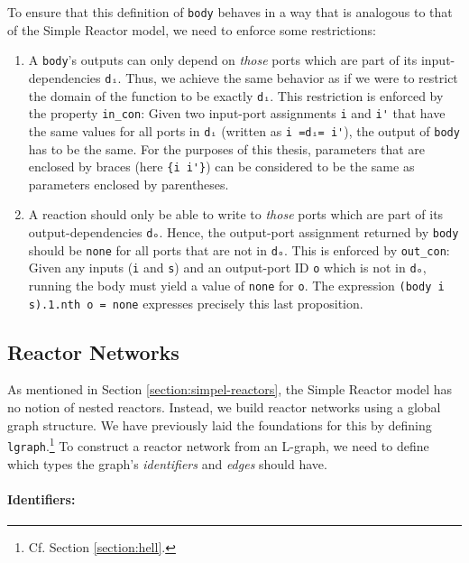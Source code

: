 To ensure that this definition of \lstinline{body} behaves in a way that is analogous to that of the Simple Reactor model, we need to enforce some restrictions:

\begin{enumerate}
    \item A \lstinline{body}'s outputs can only depend on \emph{those} ports which are part of its input-dependencies \lstinline{dᵢ}.
    Thus, we achieve the same behavior as if we were to restrict the domain of the function to be exactly \lstinline{dᵢ}. 
    This restriction is enforced by the property \lstinline{in_con}:
    Given two input-port assignments \lstinline{i} and \lstinline{i'} that have the same values for all ports in \lstinline{dᵢ} (written as \lstinline{i =dᵢ= i'}), the output of \lstinline{body} has to be the same.
    For the purposes of this thesis, parameters that are enclosed by braces (here \lstinline|{i i'}|) can be considered to be the same as parameters enclosed by parentheses.
    \item A reaction should only be able to write to \emph{those} ports which are part of its output-dependencies \lstinline{dₒ}.
    Hence, the output-port assignment returned by \lstinline{body} should be \lstinline{none} for all ports that are not in \lstinline{dₒ}.
    This is enforced by \lstinline{out_con}:
    Given any inputs (\lstinline{i} and \lstinline{s}) and an output-port ID \lstinline{o} which is not in \lstinline{dₒ}, running the body must yield a value of \lstinline{none} for \lstinline{o}.
    The expression \lstinline{(body i s).1.nth o = none} expresses precisely this last proposition.
\end{enumerate}

\subsection{Reactor Networks}

As mentioned in Section \ref{section:simpel-reactors}, the Simple Reactor model has no notion of nested reactors.
Instead, we build reactor networks using a global graph structure.
We have previously laid the foundations for this by defining \lstinline{lgraph}.\footnote{Cf. Section \ref{section:hell}.}
To construct a reactor network from an L-graph, we need to define which types the graph's \emph{identifiers} and \emph{edges} should have.

\paragraph{Identifiers:}

